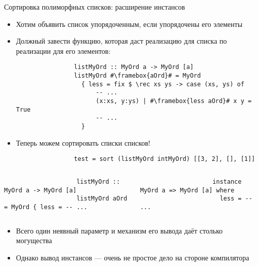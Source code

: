     \begin{frame}[fragile]{Сортировка полиморфных списков: расширение инстансов}
        \begin{itemize}
            \item Хотим объявить список упорядоченным, если упорядочены его элементы
            \item Должный завести функцию, которая даст реализацию для списка по реализации для его элементов:
            \begin{verbatim}
                listMyOrd :: MyOrd a -> MyOrd [a]
                listMyOrd #\framebox{aOrd}# = MyOrd
                  { less = fix $ \rec xs ys -> case (xs, ys) of
                      -- ...
                      (x:xs, y:ys) | #\framebox{less aOrd}# x y = True
                      -- ...
                  }
            \end{verbatim}
            \item Теперь можем сортировать списки списков!
            \begin{verbatim}
                test = sort (listMyOrd intMyOrd) [[3, 2], [], [1]]
            \end{verbatim}
        \end{itemize}
        \vspace{-1em}
        \begin{columns}[onlytextwidth]
            \begin{column}[t]{0.485\textwidth}
                \begin{verbatim}
                    listMyOrd :: MyOrd a -> MyOrd [a]
                    listMyOrd aOrd = MyOrd { less = -- ...
                \end{verbatim}
            \end{column}\hfill%
            \begin{column}[t]{0.485\textwidth}
                \begin{verbatim}
                    instance MyOrd a => MyOrd [a] where
                      less = -- ...
                \end{verbatim}
            \end{column}
        \end{columns}
        \vspace{0.5em}
        \begin{itemize}
            \item Всего один неявный параметр и механизм его вывода даёт столько могущества
            \item Однако вывод инстансов --- очень не простое дело на стороне компилятора
        \end{itemize}
    \end{frame}

